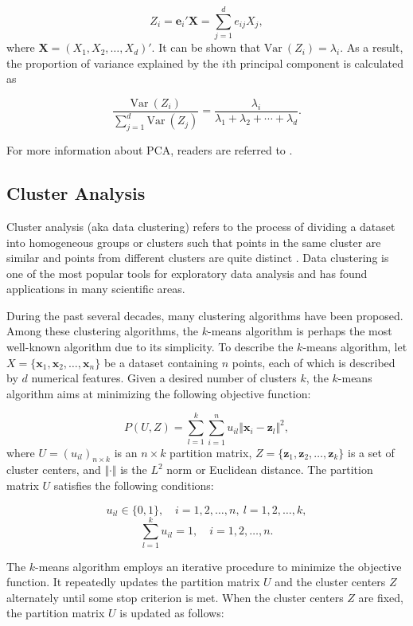 \documentclass[]{book}
\theoremstyle{definition}
\theoremstyle{definition}
\theoremstyle{definition}
\theoremstyle{remark}
\begin{document}
\[Z_{i} = \textbf{e}_i' \textbf{X} =\sum_{j=1}^d e_{ij} X_j,\] where
\(\textbf{X}=(X_1,X_2,\ldots,X_d)'\). It can be shown that
\(\mathrm{Var~}{(Z_i)} = \lambda_i\). As a result, the proportion of
variance explained by the \(i\)th principal component is calculated as

\[\dfrac{\mathrm{Var~}{(Z_i)}}{ \sum_{j=1}^{d} \mathrm{Var~}{(Z_j)}} = \dfrac{\lambda_i}{\lambda_1+\lambda_2+\cdots+\lambda_d}.\]

For more information about PCA, readers are referred to
\citep{mirkin2011}.

\subsection{Cluster Analysis}\label{cluster-analysis}

Cluster analysis (aka data clustering) refers to the process of dividing
a dataset into homogeneous groups or clusters such that points in the
same cluster are similar and points from different clusters are quite
distinct \citep{gan2007, gan2011}. Data clustering is one of the most
popular tools for exploratory data analysis and has found applications
in many scientific areas.

During the past several decades, many clustering algorithms have been
proposed. Among these clustering algorithms, the \(k\)-means algorithm
is perhaps the most well-known algorithm due to its simplicity. To
describe the \(k\)-means algorithm, let
\(X=\{\textbf{x}_1,\textbf{x}_2,\ldots,\textbf{x}_n\}\) be a dataset
containing \(n\) points, each of which is described by \(d\) numerical
features. Given a desired number of clusters \(k\), the \(k\)-means
algorithm aims at minimizing the following objective function:

\[P(U,Z) = \sum_{l=1}^k\sum_{i=1}^n u_{il} \Vert \textbf{x}_i-\textbf{z}_l\Vert^2,\]
where \(U=(u_{il})_{n\times k}\) is an \(n\times k\) partition matrix,
\(Z=\{\textbf{z}_1,\textbf{z}_2,\ldots,\textbf{z}_k\}\) is a set of
cluster centers, and \(\Vert\cdot\Vert\) is the \(L^2\) norm or
Euclidean distance. The partition matrix \(U\) satisfies the following
conditions:

\[u_{il}\in \{0,1\},\quad i=1,2,\ldots,n,\:l=1,2,\ldots,k,\]
\[\sum_{l=1}^k u_{il}=1,\quad i=1,2,\ldots,n.\]

The \(k\)-means algorithm employs an iterative procedure to minimize the
objective function. It repeatedly updates the partition matrix \(U\) and
the cluster centers \(Z\) alternately until some stop criterion is met.
When the cluster centers \(Z\) are fixed, the partition matrix \(U\) is
updated as follows:
\end{document}
